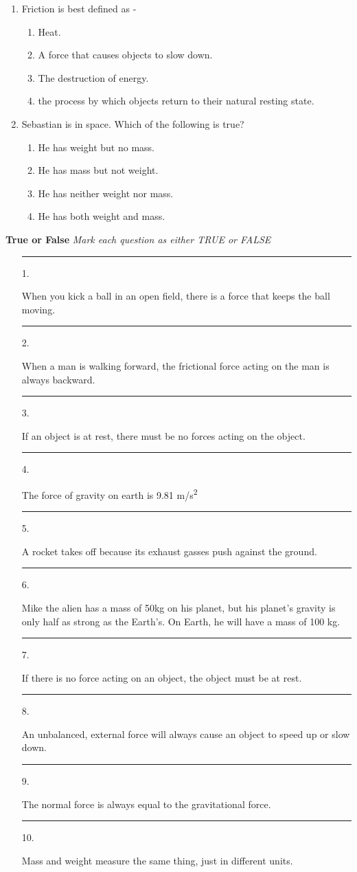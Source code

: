 \documentclass[letterpaper, 12pt]{article}
\begin{document}
\begin{enumerate}
	\item Friction is best defined as - 
			\begin{enumerate}
			\item Heat.
			\item A force that causes objects to slow down.
			\item The destruction of energy.
			\item the process by which objects return to their natural resting state.
			
		\end{enumerate}
	
	\item Sebastian is in space.  Which of the following is true?
\begin{enumerate}
	\item He has weight but no mass.
	\item He has mass but not weight.
	\item He has neither weight nor mass.
	\item He has both weight and mass.
	
\end{enumerate}



\end{enumerate}
		
		\vspace{1.2in}
		
\textbf{True or False} \textit{Mark each question as either TRUE or FALSE}
\begin{enumerate}
	\item [\rule{0.4in}{0.01in} 1.]When you kick a ball in an open field, there is a force that keeps the ball moving.
    \item [\rule{0.4in}{0.01in} 2.]When a man is walking forward, the frictional force acting on the man is always backward.
    \item [\rule{0.4in}{0.01in} 3.]If an object is at rest, there must be no forces acting on the object.
    \item [\rule{0.4in}{0.01in} 4.]The force of gravity on earth is 9.81 m/s\textsuperscript{2}
    \item [\rule{0.4in}{0.01in} 5.]A rocket takes off because its exhaust gasses push against the ground. 
    \item [\rule{0.4in}{0.01in} 6.]Mike the alien has a mass of 50kg on his planet, but his planet's gravity is only half as strong as the Earth's.  On Earth, he will have a mass of 100 kg.
    \item [\rule{0.4in}{0.01in} 7.] If there is no force acting on an object, the object must be at rest.
    \item [\rule{0.4in}{0.01in} 8.]An unbalanced, external force will always cause an object to speed up or slow down.
    \item [\rule{0.4in}{0.01in} 9.]The normal force is always equal to the gravitational force.
    \item [\rule{0.3in}{0.01in} 10.]Mass and weight measure the same thing, just in different units.
    
    
    
\end{enumerate}
\end{document}
